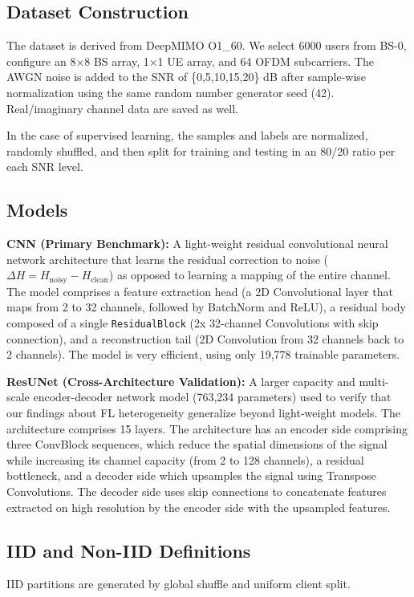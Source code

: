 \documentclass{llncs}
\begin{document}
\subsection{Dataset Construction}
The dataset is derived from DeepMIMO O1\_60. We select 6000 users from BS-0, configure an 8$\times$8 BS array, 1$\times$1 UE array, and 64 OFDM subcarriers. The AWGN noise is added to the SNR of \{0,5,10,15,20\} dB after sample-wise normalization using the same random number generator seed (42). Real/imaginary channel data are saved as well.

In the case of supervised learning, the samples and labels are normalized, randomly shuffled, and then split for training and testing in an 80/20 ratio per each SNR level.

\subsection{Models}
\textbf{CNN (Primary Benchmark):} A light-weight residual convolutional neural network architecture that learns the residual correction to noise ($\Delta H = H_{\text{noisy}} - H_{\text{clean}}$) as opposed to learning a mapping of the entire channel. The model comprises a feature extraction head (a 2D Convolutional layer that maps from 2 to 32 channels,
followed by BatchNorm and ReLU), a residual body composed of a single \texttt{ResidualBlock} (2x 32-channel Convolutions with skip connection), and a reconstruction tail (2D Convolution from 32 channels back to 2 channels). The model is very efficient, using only 19,778 trainable parameters.




\textbf{ResUNet (Cross-Architecture Validation):} A larger capacity and multi-scale encoder-decoder network model (763,234 parameters) used to verify that our findings about
FL heterogeneity generalize beyond light-weight models. The architecture comprises 15 layers. The architecture has an encoder side comprising three ConvBlock sequences, which reduce the spatial dimensions of the signal while increasing its channel capacity (from 2 to 128 channels), a residual bottleneck, and a decoder side which upsamples the signal using Transpose Convolutions. The decoder side uses skip connections to concatenate features extracted on high resolution by the encoder side with the upsampled features.

\subsection{IID and Non-IID Definitions}
IID partitions are generated by global shuffle and uniform client split.
\end{document}
